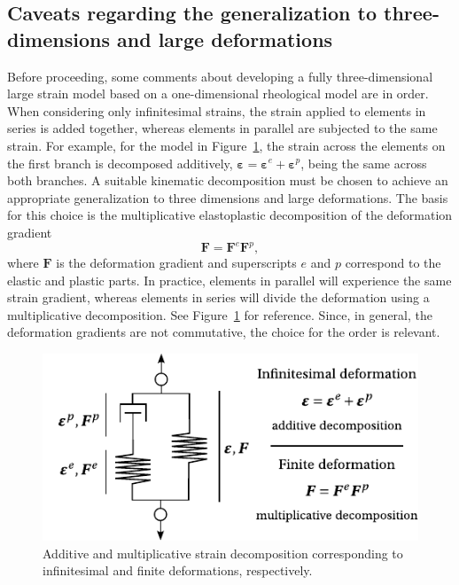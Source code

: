 
\subsection{Caveats regarding the generalization to three-dimensions and large deformations}
\label{sec:generalization_large_strains_3d}

Before proceeding, some comments about developing a fully three-dimensional large strain model based on a one-dimensional rheological model are in order.
When considering only infinitesimal strains, the strain applied to elements in series is added together, whereas elements in parallel are subjected to the same strain.
For example, for the model in Figure~\ref{fig:gradient_decomp}, the strain across the elements on the first branch is decomposed additively, $\bm \varepsilon = \bm \varepsilon^e + \bm \varepsilon^p$, being the same across both branches.
A suitable kinematic decomposition must be chosen to achieve an appropriate generalization to three dimensions and large deformations.
The basis for this choice is the multiplicative elastoplastic decomposition of the deformation gradient \citep{desouzanetoComputationalMethodsPlasticity2008}
\begin{equation}
	\label{eq:mult_gradient_decomp}
\bm F = \bm F^e \bm F^p,
\end{equation}
where $\bm F$ is the deformation gradient and superscripts $e$ and $p$ correspond to the elastic and plastic parts.
In practice, elements in parallel will experience the same strain gradient, whereas elements in series will divide the deformation using a multiplicative decomposition.
See Figure~\ref{fig:gradient_decomp} for reference.
Since, in general, the deformation gradients are not commutative, the choice for the order is relevant.
\begin{figure}[hbtp]
	\centering
	\includegraphics{figures/gradient_decomp}
	\caption{Additive and multiplicative strain decomposition corresponding to infinitesimal and finite deformations, respectively.}
\label{fig:gradient_decomp}
\end{figure}

